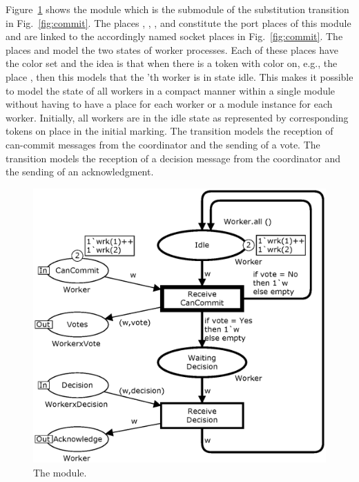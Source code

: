Figure~\ref{fig:worker} shows the  module which is
the submodule of the  substitution transition in
Fig.~\ref{fig:commit}. The places ,
, , and 
constitute the port places of this module and are linked to the
accordingly named socket places in Fig.~\ref{fig:commit}. The places
 and  model the two states of
worker processes. Each of these places have the color set
 and the idea is that when there is a token with color
 on, e.g., the place , then this models
that the 'th worker is in state idle. This makes it possible to model
the state of all workers in a compact manner within a single module
without having to have a place for each worker or a module instance
for each worker. Initially, all workers are in the idle state as
represented by corresponding tokens on place  in the
initial marking. The transition  models the
reception of can-commit messages from the coordinator and the sending
of a vote. The transition  models the
reception of a decision message from the coordinator and the sending
of an acknowledgment.

\begin{figure}[]
\centering
\includegraphics[scale=.45]{figures/Workers.eps}
\caption{The  module.}
\label{fig:worker}
\end{figure}

